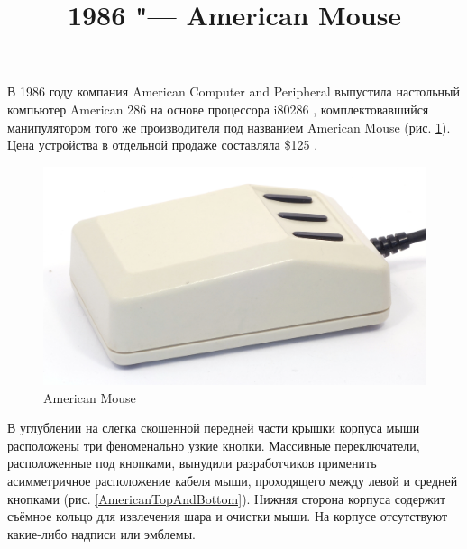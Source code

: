 \documentclass[11pt, a4paper]{article}
\begin{document}
\title{1986 "--- American Mouse}
\date{}
\maketitle
{}
В 1986 году компания American Computer and Peripheral выпустила настольный компьютер American 286 на основе процессора i80286 \cite{adv}, комплектовавшийся манипулятором того же производителя под названием American Mouse (рис. \ref{fig:AmericanPic}). Цена устройства в отдельной продаже составляла \$125 \cite{review}.

\begin{figure}[h]
    \centering
    \includegraphics[scale=0.7]{1986_american_mouse/pic_30.jpg}
    \caption{American Mouse}
    \label{fig:AmericanPic}
\end{figure}

В углублении на слегка скошенной передней части крышки корпуса мыши расположены три феноменально узкие кнопки. Массивные переключатели, расположенные под кнопками, вынудили разработчиков применить асимметричное расположение кабеля мыши, проходящего между левой и средней кнопками (рис. \ref{AmericanTopAndBottom}). Нижняя сторона корпуса содержит съёмное кольцо для извлечения шара и очистки мыши. На корпусе отсутствуют какие-либо надписи или эмблемы.
\end{document}
